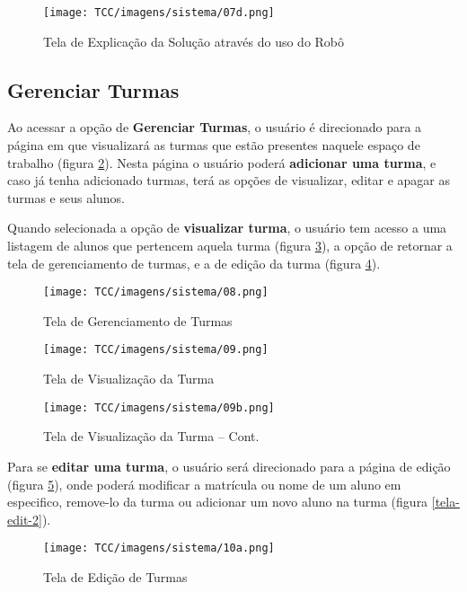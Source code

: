 \begin{anexosenv}
\begin{figure}[H]
     \centering
     \texttt{[image: TCC/imagens/sistema/07d.png]}
     \caption{Tela de Explicação da Solução através do uso do Robô}
     \label{tela-robo}
\end{figure}

\subsection{Gerenciar Turmas}

Ao acessar a opção de \textbf{Gerenciar Turmas}, o usuário é direcionado para a página em que visualizará as turmas que estão presentes naquele espaço de trabalho (figura \ref{tela-gerenciador}). Nesta página o usuário poderá \textbf{adicionar uma turma}, e caso já tenha adicionado turmas, terá as opções de visualizar, editar e apagar as turmas e seus alunos.

Quando selecionada a opção de \textbf{visualizar turma}, o usuário tem acesso a uma listagem de alunos que pertencem aquela turma (figura \ref{tela-visu-1}), a opção de retornar a tela de gerenciamento de turmas, e a de edição da turma (figura \ref{tela-visu-2}).
\begin{figure}[H]
     \centering
     \texttt{[image: TCC/imagens/sistema/08.png]}
     \caption{Tela de Gerenciamento de Turmas}
     \label{tela-gerenciador}
\end{figure}

\begin{figure}[H]
     \centering
     \texttt{[image: TCC/imagens/sistema/09.png]}
     \caption{Tela de Visualização da Turma}
     \label{tela-visu-1}
\end{figure}

\begin{figure}[H]
     \centering
     \texttt{[image: TCC/imagens/sistema/09b.png]}
     \caption{Tela de Visualização da Turma -- Cont.}
     \label{tela-visu-2}
\end{figure}

Para se \textbf{editar uma turma}, o usuário será direcionado para a página de edição (figura \ref{tela-edit-1}), onde poderá modificar a matrícula ou nome de um aluno em especifico, remove-lo da turma ou adicionar um novo aluno na turma (figura \ref{tela-edit-2}).


\begin{figure}[H]
     \centering
     \texttt{[image: TCC/imagens/sistema/10a.png]}
     \caption{Tela de Edição de Turmas}
     \label{tela-edit-1}
\end{figure}


\end{anexosenv}
